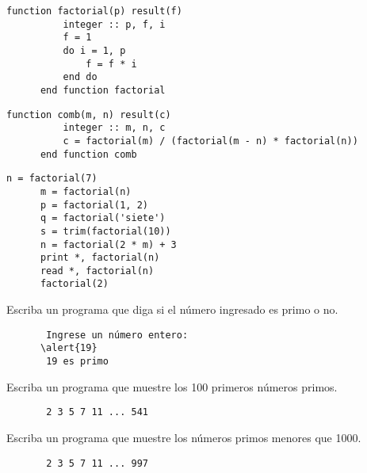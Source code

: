\documentclass[10pt]{beamer}
\begin{document}
  \begin{frame}[fragile]
    \begin{lstlisting}[gobble=6,frame=single]
      function factorial(p) result(f)
          integer :: p, f, i
          f = 1
          do i = 1, p
              f = f * i
          end do
      end function factorial
    \end{lstlisting}
    \pause
    \begin{lstlisting}[gobble=6,frame=single]
      function comb(m, n) result(c)
          integer :: m, n, c
          c = factorial(m) / (factorial(m - n) * factorial(n))
      end function comb
    \end{lstlisting}
    
\end{frame}

  \begin{frame}
    
  \end{frame}

  \begin{frame}[fragile]
    \begin{lstlisting}[gobble=6,frame=single]
      n = factorial(7)
      m = factorial(n)
      p = factorial(1, 2)
      q = factorial('siete')
      s = trim(factorial(10))
      n = factorial(2 * m) + 3
      print *, factorial(n)
      read *, factorial(n)
      factorial(2)
    \end{lstlisting}
\end{frame}

  \begin{frame}[fragile]
    Escriba un programa que diga si el número ingresado
    es primo o no.
    \begin{Verbatim}
       Ingrese un número entero:
      \alert{19}
       19 es primo
    \end{Verbatim}

    Escriba un programa que muestre los 100 primeros números primos.
    \begin{Verbatim}
       2 3 5 7 11 ... 541
    \end{Verbatim}

    Escriba un programa que muestre los números primos menores que 1000.
    \begin{Verbatim}
       2 3 5 7 11 ... 997
    \end{Verbatim}
\end{frame}
\end{document}
